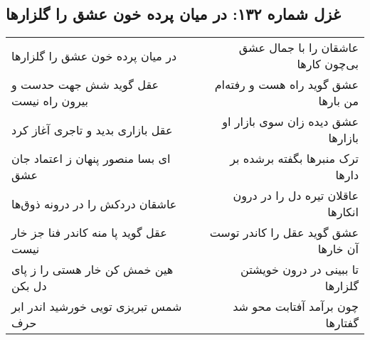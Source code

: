 \begin{center}
\section*{غزل شماره ۱۳۲: در میان پرده خون عشق را گلزارها}
\label{sec:0132}
\begin{longtable}{l p{0.5cm} r}
در میان پرده خون عشق را گلزارها
&&
عاشقان را با جمال عشق بی‌چون کارها
\\
عقل گوید شش جهت حدست و بیرون راه نیست
&&
عشق گوید راه هست و رفته‌ام من بارها
\\
عقل بازاری بدید و تاجری آغاز کرد
&&
عشق دیده زان سوی بازار او بازارها
\\
ای بسا منصور پنهان ز اعتماد جان عشق
&&
ترک منبرها بگفته برشده بر دارها
\\
عاشقان دردکش را در درونه ذوق‌ها
&&
عاقلان تیره دل را در درون انکارها
\\
عقل گوید پا منه کاندر فنا جز خار نیست
&&
عشق گوید عقل را کاندر توست آن خارها
\\
هین خمش کن خار هستی را ز پای دل بکن
&&
تا ببینی در درون خویشتن گلزارها
\\
شمس تبریزی تویی خورشید اندر ابر حرف
&&
چون برآمد آفتابت محو شد گفتارها
\\
\end{longtable}
\end{center}
